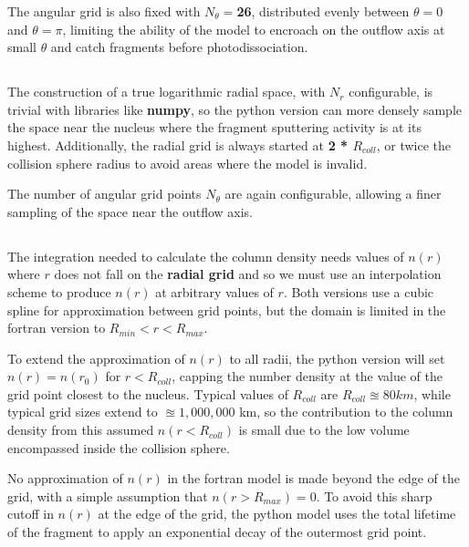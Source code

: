 \documentclass[11pt]{article}
\newcommand{\modelterm}[1]{\textcolor{myred}{\textbf{#1}}}
\newcommand{\magicnumber}[1]{\textcolor{myred}{\textbf{#1}}}
\newcommand{\problempart}[1]{\subsection*{\contour{mybblack}{\textcolor{myblack}{#1}}}}
\begin{document}
The angular grid is also fixed with \(N_{\theta} = \)\magicnumber{26}, distributed evenly between \(\theta = 0\) and \(\theta = \pi\), limiting the ability of the model to encroach on the outflow axis at small \(\theta\) and catch fragments before photodissociation.

\problempart{Spatial Gridding: Python}
The construction of a true logarithmic radial space, with \(N_r\) configurable, is trivial with libraries like \modelterm{numpy}, so the python version can more densely sample the space near the nucleus where the fragment sputtering activity is at its highest.
Additionally, the radial grid is always started at \magicnumber{2 * \(R_{coll}\)}, or twice the collision sphere radius to avoid areas where the model is invalid.

The number of angular grid points \(N_{\theta}\) are again configurable, allowing a finer sampling of the space near the outflow axis.

\problempart{Column Density Calculation}
The integration needed to calculate the column density needs values of \(n(r)\) where \(r\) does not fall on the \modelterm{radial grid} and so we must use an interpolation scheme to produce \(n(r)\) at arbitrary values of \(r\).
Both versions use a cubic spline for approximation between grid points, but the domain is limited in the fortran version to \(R_{min} < r < R_{max}\).

To extend the approximation of \(n(r)\) to all radii, the python version will set \(n(r) = n(r_0)\) for \(r < R_{coll}\), capping the number density at the value of the grid point closest to the nucleus.
Typical values of \(R_{coll}\) are \(R_{coll} \approxeq 80 km\), while typical grid sizes extend to \(\approxeq 1,000,000\) km, so the contribution to the column density from this assumed \(n(r < R_{coll})\) is small due to the low volume encompassed inside the collision sphere.

No approximation of \(n(r)\) in the fortran model is made beyond the edge of the grid, with a simple assumption that \(n(r > R_{max}) = 0\).
To avoid this sharp cutoff in \(n(r)\) at the edge of the grid, the python model uses the total lifetime of the fragment to apply an exponential decay of the outermost grid point.
\end{document}
